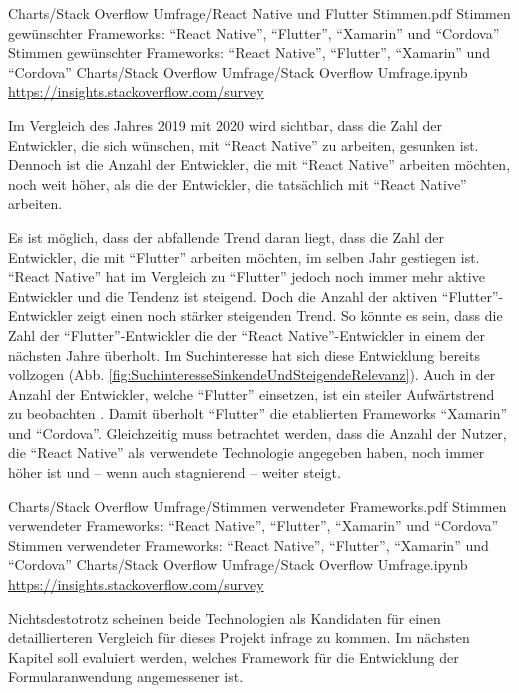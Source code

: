\begin{alexfigurewithnotebook}{Charts/Stack Overflow Umfrage/React Native und Flutter Stimmen.pdf}
	{Stimmen gewünschter Frameworks: \enquote{React Native}, \enquote{Flutter}, \enquote{Xamarin} und \enquote{Cordova}}
	{Stimmen gewünschter Frameworks: \enquote{React Native}, \enquote{Flutter}, \enquote{Xamarin} und \enquote{Cordova}}
	{Charts/Stack Overflow Umfrage/Stack Overflow Umfrage.ipynb}
	{\url{https://insights.stackoverflow.com/survey}}
	\label{fig:ReactNativeUndFlutterStimmen}

\end{alexfigurewithnotebook}

Im Vergleich des Jahres 2019 mit 2020 wird sichtbar, dass die Zahl der Entwickler, die sich wünschen, mit \enquote{React Native} zu arbeiten, gesunken ist.
Dennoch ist die Anzahl der Entwickler, die mit \enquote{React Native} arbeiten möchten, noch weit höher, als die der Entwickler, die tatsächlich mit \enquote{React Native} arbeiten.

Es ist möglich, dass der abfallende Trend daran liegt, dass die Zahl der Entwickler, die mit \enquote{Flutter} arbeiten möchten, im selben Jahr gestiegen ist.
\enquote{React Native} hat im Vergleich zu \enquote{Flutter} jedoch noch immer mehr aktive Entwickler und die Tendenz ist steigend.
Doch die Anzahl der aktiven \enquote{Flutter}-Entwickler zeigt einen noch stärker steigenden Trend.
So könnte es sein, dass die Zahl der \enquote{Flutter}-Entwickler die der \enquote{React Native}-Entwickler in einem der nächsten Jahre überholt.
Im Suchinteresse hat sich diese Entwicklung bereits vollzogen (Abb. \ref{fig:SuchinteresseSinkendeUndSteigendeRelevanz}).
Auch in der Anzahl der Entwickler, welche \enquote{Flutter} einsetzen, ist ein steiler Aufwärtstrend zu beobachten \Abb{\ref{fig:StimmenVerwendeterFrameworks}}.
Damit überholt \enquote{Flutter} die etablierten Frameworks \enquote{Xamarin} und \enquote{Cordova}.
Gleichzeitig muss betrachtet werden,
dass die Anzahl der Nutzer,
die \enquote{React Native} als verwendete Technologie angegeben haben,
noch immer höher ist und -- wenn auch stagnierend -- weiter steigt. 

\begin{alexfigurewithnotebook}{Charts/Stack Overflow Umfrage/Stimmen verwendeter Frameworks.pdf}
	{Stimmen verwendeter Frameworks: \enquote{React Native}, \enquote{Flutter}, \enquote{Xamarin} und \enquote{Cordova}}
	{Stimmen verwendeter Frameworks: \enquote{React Native}, \enquote{Flutter}, \enquote{Xamarin} und \enquote{Cordova}}
	{Charts/Stack Overflow Umfrage/Stack Overflow Umfrage.ipynb}
	{\url{https://insights.stackoverflow.com/survey}}
	\label{fig:StimmenVerwendeterFrameworks}
\end{alexfigurewithnotebook}

Nichtsdestotrotz scheinen beide Technologien als Kandidaten für einen detaillierteren Vergleich für dieses Projekt infrage zu kommen.
Im nächsten Kapitel soll evaluiert werden, welches Framework für die Entwicklung der Formularanwendung angemessener ist.